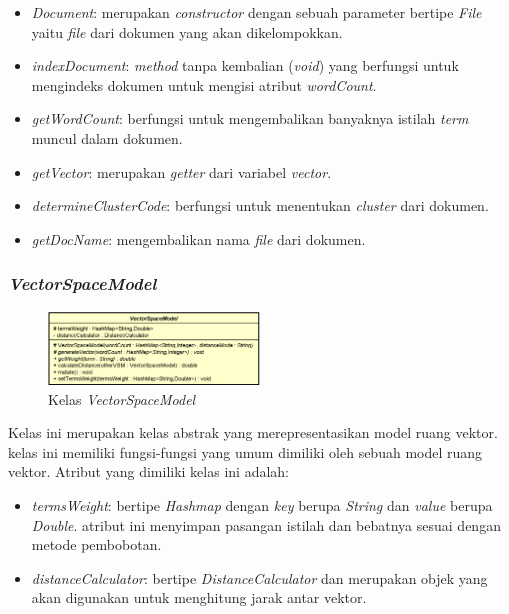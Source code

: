 \documentclass[a4paper,twoside]{article}
\begin{document}
\begin{enumerate}
\begin{itemize}
	\item \textit{Document}: merupakan \textit{constructor} dengan sebuah parameter bertipe \textit{File} yaitu \textit{file} dari dokumen yang akan dikelompokkan.
	\item \textit{indexDocument}: \textit{method} tanpa kembalian (\textit{void}) yang berfungsi untuk mengindeks dokumen untuk mengisi atribut \textit{wordCount}.
	\item \textit{getWordCount}: berfungsi untuk mengembalikan banyaknya istilah \textit{term} muncul dalam dokumen.
	\item \textit{getVector}: merupakan \textit{getter} dari variabel \textit{vector}.
	\item \textit{determineClusterCode}: berfungsi untuk menentukan \textit{cluster} dari dokumen.
	\item \textit{getDocName}: mengembalikan nama \textit{file} dari dokumen.
\end{itemize}

\subsubsection*{\textit{VectorSpaceModel}}

\begin{figure}[h]
	\begin{center}
		\includegraphics[width=0.5\textwidth]{DiagramKelas/VectorSpaceModel}
		\caption{Kelas \textit{VectorSpaceModel}}
		\label{fig:kelasVSM}
	\end{center}
\end{figure}

Kelas ini merupakan kelas abstrak yang merepresentasikan model ruang vektor. kelas ini memiliki fungsi-fungsi yang umum dimiliki oleh sebuah model ruang vektor. Atribut yang dimiliki kelas ini adalah:

\begin{itemize}
	\item \textit{termsWeight}: bertipe \textit{Hashmap} dengan \textit{key} berupa \textit{String} dan \textit{value} berupa \textit{Double}. atribut ini menyimpan pasangan istilah dan bebatnya sesuai dengan metode pembobotan.
	\item \textit{distanceCalculator}: bertipe \textit{DistanceCalculator} dan merupakan objek yang akan digunakan untuk menghitung jarak antar vektor.
\end{itemize}


\end{enumerate}
\end{document}

